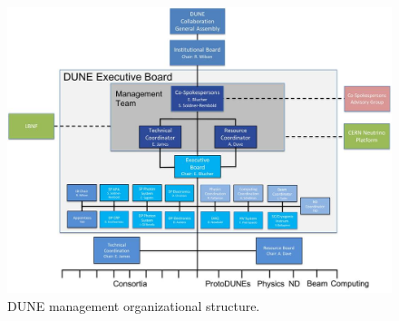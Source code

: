 \begin{figure}[htb]
  \begin{center}
    \includegraphics[width=\textwidth]{far-detector-generic/figures/DUNE_mgmt}
    \caption{DUNE management organizational structure.}
    \label{fig:DUNE_org}
  \end{center}
\end{figure}



